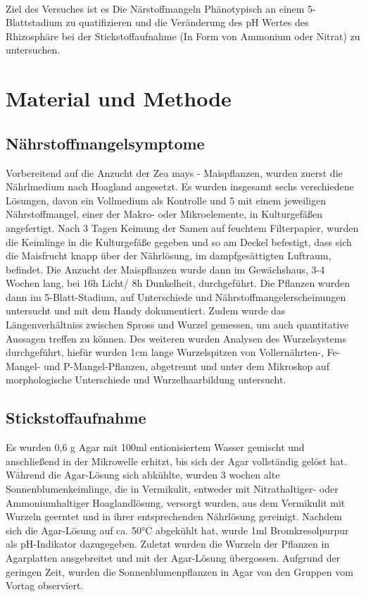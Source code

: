 \documentclass[10pt,a4paper]{article}
\begin{document}
		\\
		Ziel des Versuches ist es Die Närstoffmangeln Phänotypisch an einem 5-Blattstadium zu quatifizieren und die Veränderung des pH Wertes des Rhizosphäre bei der Stickstoffaufnahme (In Form von Ammonium oder Nitrat) zu untersuchen.
	
	
	\section{Material und Methode}
		\subsection{Nährstoffmangelsymptome}
		Vorbereitend auf die Anzucht der Zea mays - Maispflanzen, wurden zuerst die Nährlmedium nach Hoagland angesetzt. Es wurden insgesamt sechs verschiedene Lösungen, davon ein Vollmedium als Kontrolle und 5 mit einem jeweiligen Nährstoffmangel, einer der Makro- oder Mikroelemente, in Kulturgefäßen angefertigt. Nach 3 Tagen Keimung der Samen auf feuchtem Filterpapier, wurden die Keimlinge in die Kulturgefäße gegeben und so am Deckel befestigt, dass sich die Maisfrucht knapp über der Nährlösung, im dampfgesättigten Luftraum, befindet. Die Anzucht der Maispflanzen wurde dann im Gewächshaus, 3-4 Wochen lang, bei 16h Licht/ 8h Dunkelheit, durchgeführt. Die Pflanzen wurden dann im 5-Blatt-Stadium, auf Unterschiede und Nährstoffmangelerscheinungen untersucht und mit dem Handy dokumentiert. Zudem wurde das Längenverhältniss zwischen Spross und Wurzel gemessen, um auch quantitative Aussagen treffen zu können. Des weiteren wurden Analysen des Wurzelsystems durchgeführt, hiefür wurden 1cm lange Wurzelspitzen von Vollernährten-, Fe-Mangel- und P-Mangel-Pflanzen, abgetrennt und unter dem Mikroskop auf morphologische Unterschiede und Wurzelhaarbildung untersucht.
		\subsection{Stickstoffaufnahme}
		Es wurden 0,6 g Agar mit 100ml entionisiertem Wasser gemischt und anschließend in der Mikrowelle erhitzt, bis sich der Agar vollständig gelöst hat. Während die Agar-Lösung sich abkühlte, wurden 3 wochen alte Sonnenblumenkeimlinge, die in Vermikulit, entweder mit Nitrathaltiger- oder Ammoniumhaltiger Hoaglandlösung, versorgt wurden, aus dem Vermikulit mit Wurzeln geerntet und in ihrer entsprechenden Nährlösung gereinigt. Nachdem sich die Agar-Lösung auf ca. 50°C abgekühlt hat, wurde 1ml Bromkresolpurpur als pH-Indikator dazugegeben. Zuletzt wurden die Wurzeln der Pflanzen in Agarplatten ausgebreitet und mit der Agar-Lösung übergossen. Aufgrund der geringen Zeit, wurden die Sonnenblumenpflanzen in Agar von den Gruppen vom Vortag observiert.
	
\end{document}
